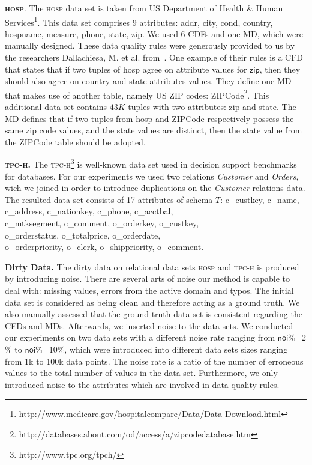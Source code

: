 \textbf{\textsc{hosp}}. The \textsc{hosp} data set is taken from US Department of Health $\&$ Human Services\footnote{http://www.medicare.gov/hospitalcompare/Data/Data-Download.html}. This data set comprises 9 attributes: \textsf{addr}, \textsf{city}, \textsf{cond}, \textsf{country}, \textsf{hospname}, \textsf{measure}, \textsf{phone}, \textsf{state}, \textsf{zip}. 
We used 6 CDFs and one MD, which were manually designed. These data quality rules were generously provided to us by the researchers Dallachiesa, M. et al. from~\cite{Dallachiesa:2013:NCD:2463676.2465327}. One example of their rules is a CFD that states that if two tuples of \textsf{hosp} agree on attribute values for $\textsf{zip}$, then they should also agree on \textsf{country} and \textsf{state} attributes values. They define one MD that makes use of another table, namely US ZIP codes: ZIPCode\footnote{http://databases.about.com/od/access/a/zipcodedatabase.htm}. This additional data set contains $43K$ tuples with two attributes: \textsf{zip} and \textsf{state}. The MD defines that if two tuples from \textsf{hosp} and ZIPCode respectively possess the same zip code values, and the state values are distinct, then the state value from the ZIPCode table should be adopted. 

\textbf{\textsc{tpc-h}.} The \textsc{tpc-h}\footnote{http://www.tpc.org/tpch/} is well-known data set used in decision support benchmarks for databases. For our experiments we used two relations \textit{Customer} and \textit{Orders}, wich we joined in order to introduce duplications on the \textit{Customer} relations data. The resulted data set consists of 17 attributes of schema $T$: \textsf{c\_custkey}, \textsf{c\_name}, \textsf{c\_address},  \textsf{c\_nationkey}, \textsf{c\_phone}, \textsf{c\_acctbal},\\ \textsf{c\_mtksegment}, \textsf{c\_comment}, \textsf{o\_orderkey}, \textsf{o\_custkey},\\ \textsf{o\_orderstatus}, \textsf{o\_totalprice}, \textsf{o\_orderdate},\\ \textsf{o\_orderpriority}, \textsf{o\_clerk}, \textsf{o\_shippriority}, \textsf{o\_comment}. 

\textbf{Dirty Data.} The dirty data on relational data sets \textsc{hosp} and \textsc{tpc-h} is produced by introducing noise. There are several arts of noise our method is capable to deal with: missing values, errors from the active domain and typos. The initial data set is considered as being clean and therefore acting as a ground truth. We also manually assessed that the ground truth data set is consistent regarding the CFDs and MDs. Afterwards, we inserted noise to the data sets. We conducted our experiments on two data sets with a different noise rate ranging from $\mathsf{noi\%}$=2$\%$ to $\mathsf{noi\%}$=10$\%$, which were introduced into different data sets sizes ranging from 1k to 100k data points. The noise rate is a ratio of the number of erroneous values to the total number of values in the data set. Furthermore, we only introduced noise to the attributes which are involved in data quality rules.

